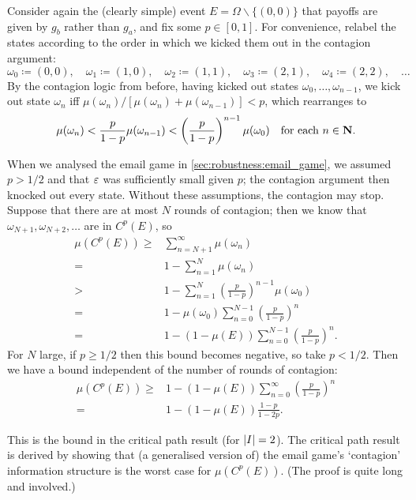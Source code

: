 \documentclass[11pt,letterpaper,reqno,oneside]{article}
\begin{document}
%
Consider again the (clearly simple) event $E = \Omega \backslash \{(0,0)\}$ that payoffs are given by $g_b$ rather than $g_a$, and fix some $p \in [0,1]$. For convenience, relabel the states according to the order in which we kicked them out in the contagion argument:
%
\begin{equation*}
	\omega_0 \coloneqq (0,0) , \quad
	\omega_1 \coloneqq (1,0) , \quad
	\omega_2 \coloneqq (1,1) , \quad
	\omega_3 \coloneqq (2,1) , \quad
	\omega_4 \coloneqq (2,2) , \quad
	\dots
\end{equation*}
%
By the contagion logic from before, having kicked out states $\omega_0,\dots,\omega_{n-1}$, we kick out state $\omega_n$ iff $\mu(\omega_n) / [ \mu(\omega_n) + \mu(\omega_{n-1}) ] < p$, which rearranges to
%
\begin{equation*}
	\mu(\omega_n) 
	< \frac{p}{1-p} \mu(\omega_{n-1})
	< \left(\frac{p}{1-p}\right)^{n-1} \mu(\omega_0)
	\quad\text{for each $n \in \N$} .
\end{equation*}


When we analysed the email game in \cref{sec:robustness:email_game}, we assumed $p>1/2$ and that $\eps$ was sufficiently small given $p$; the contagion argument then knocked out every state. Without these assumptions, the contagion may stop. Suppose that there are at most $N$ rounds of contagion; then we know that $\omega_{N+1},\omega_{N+2},\dots$ are in $C^p(E)$, so
%
\begin{align*}
	\mu(C^p(E))
	\geq{}& \sum_{n=N+1}^\infty \mu(\omega_n)
	\\
	={}& 1 - \sum_{n=1}^N \mu(\omega_n)
	\\
	>{}& 1 - \sum_{n=1}^N \left(\frac{p}{1-p}\right)^{n-1} \mu(\omega_0)
	\\	
	={}& 1 - \mu(\omega_0) \sum_{n=0}^{N-1} \left(\frac{p}{1-p}\right)^n 
	\\	
	={}& 1 - (1-\mu(E)) \sum_{n=0}^{N-1} \left(\frac{p}{1-p}\right)^n .
\end{align*}
%
For $N$ large, if $p \geq 1/2$ then this bound becomes negative, so take $p < 1/2$. Then we have a bound independent of the number of rounds of contagion:
%
\begin{align*}
	\mu(C^p(E))
	\geq{}& 1 - (1-\mu(E)) \sum_{n=0}^\infty \left(\frac{p}{1-p}\right)^n 
	\\
	={}& 1 - (1-\mu(E)) \frac{1-p}{1-2p} .
\end{align*}

This is the bound in the critical path result (for $\abs*{I}=2$). The critical path result is derived by showing that (a generalised version of) the email game's `contagion' information structure is the worst case for $\mu(C^p(E))$. (The proof is quite long and involved.)
\end{document}
